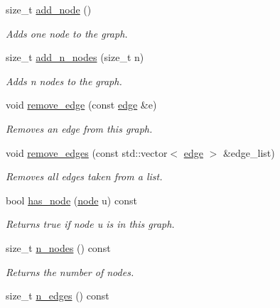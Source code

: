 \begin{DoxyCompactItemize}
size\+\_\+t \hyperlink{classlgraph_1_1xxgraph_a6cb21d5e52afbb438a3e6643998c40cf}{add\+\_\+node} ()
\begin{DoxyCompactList}\small\item\em Adds one node to the graph. \end{DoxyCompactList}\item 
size\+\_\+t \hyperlink{classlgraph_1_1xxgraph_a8dd24aa48d55dfceaa87e47c32ae914a}{add\+\_\+n\+\_\+nodes} (size\+\_\+t n)
\begin{DoxyCompactList}\small\item\em Adds {\itshape n} nodes to the graph. \end{DoxyCompactList}\item 
void \hyperlink{classlgraph_1_1xxgraph_a46a75fa2a10a8674ab930e9dc766e2f9}{remove\+\_\+edge} (const \hyperlink{namespacelgraph_a76bd7d50719f03de7a85db259d80d572}{edge} \&e)
\begin{DoxyCompactList}\small\item\em Removes an edge from this graph. \end{DoxyCompactList}\item 
void \hyperlink{classlgraph_1_1xxgraph_aef7c4bf62f3f4db362b2d3accb3b6d3d}{remove\+\_\+edges} (const std\+::vector$<$ \hyperlink{namespacelgraph_a76bd7d50719f03de7a85db259d80d572}{edge} $>$ \&edge\+\_\+list)
\begin{DoxyCompactList}\small\item\em Removes all edges taken from a list. \end{DoxyCompactList}\item 
\mbox{\label{classlgraph_1_1xxgraph_a24645831355480e05f8e7ba75a5348c8}} 
bool \hyperlink{classlgraph_1_1xxgraph_a24645831355480e05f8e7ba75a5348c8}{has\+\_\+node} (\hyperlink{namespacelgraph_a397169dd66adf725210a30fb7251773e}{node} u) const
\begin{DoxyCompactList}\small\item\em Returns true if node {\itshape u} is in this graph. \end{DoxyCompactList}\item 
size\+\_\+t \hyperlink{classlgraph_1_1xxgraph_a67f651617ada4053b569102b9a54cab0}{n\+\_\+nodes} () const
\begin{DoxyCompactList}\small\item\em Returns the number of nodes. \end{DoxyCompactList}\item 
size\+\_\+t \hyperlink{classlgraph_1_1xxgraph_af00bce8b07a42754601d1e3bebe2c1fa}{n\+\_\+edges} () const

\end{DoxyCompactItemize}
